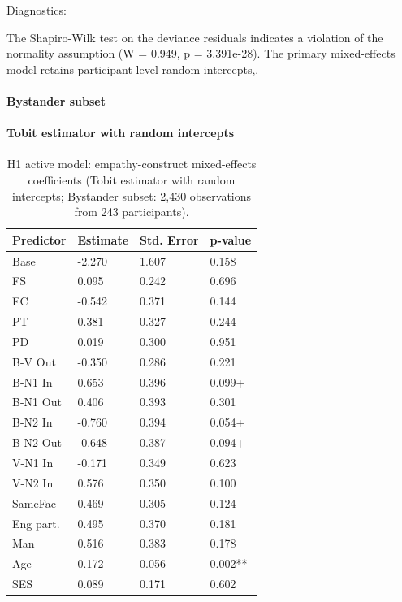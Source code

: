 \documentclass[11pt]{article}
\begin{document}
Diagnostics:

The Shapiro-Wilk test on the deviance residuals indicates a violation of the normality assumption (W = 0.949, p = 3.391e-28). The primary mixed-effects model retains participant-level random intercepts,.


\paragraph{Bystander subset}

\paragraph{Tobit estimator with random intercepts}

\begin{table}[H]
\centering
{\fontsize{11}{13}\selectfont
\renewcommand{\arraystretch}{1.10}
\caption{H1 active model: empathy-construct mixed-effects coefficients (Tobit estimator with random intercepts; Bystander subset: 2,430 observations from 243 participants).}
\label{tab:h1_b_bystander}
\begin{tabularx}{\textwidth}{>{\raggedright\arraybackslash}Xlll}
\toprule
Predictor & Estimate & Std. Error & p-value \\
\midrule
Base & -2.270 & 1.607 & 0.158 \\
FS & 0.095 & 0.242 & 0.696 \\
EC & -0.542 & 0.371 & 0.144 \\
PT & 0.381 & 0.327 & 0.244 \\
PD & 0.019 & 0.300 & 0.951 \\
B-V Out & -0.350 & 0.286 & 0.221 \\
B-N1 In & 0.653 & 0.396 & 0.099+ \\
B-N1 Out & 0.406 & 0.393 & 0.301 \\
B-N2 In & -0.760 & 0.394 & 0.054+ \\
B-N2 Out & -0.648 & 0.387 & 0.094+ \\
V-N1 In & -0.171 & 0.349 & 0.623 \\
V-N2 In & 0.576 & 0.350 & 0.100 \\
SameFac & 0.469 & 0.305 & 0.124 \\
Eng part. & 0.495 & 0.370 & 0.181 \\
Man & 0.516 & 0.383 & 0.178 \\
Age & 0.172 & 0.056 & 0.002** \\
SES & 0.089 & 0.171 & 0.602 \\
\bottomrule
\end{tabularx}
}
\end{table}
\end{document}

